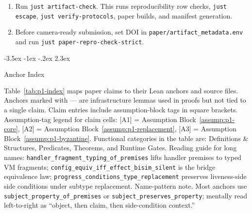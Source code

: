 \documentclass[a4paper,10pt,twocolumn,english]{article}
\makeatletter
\renewcommand{\section}{\@startsection{section}{1}{\z@}%
  {-3.5ex \@plus -1ex \@minus -.2ex}%
  {2.3ex}%
  {\raggedright\normalfont\large\bfseries}}
\numberwithin{equation}{section}
\theoremstyle{paperdef}
\theoremstyle{paperplain}
\theoremstyle{paperdef}
\theoremstyle{paperremark}
\makeatother
\begin{document}
\begin{enumerate}
	\item Run \texttt{just artifact-check}. This runs reproducibility row checks, \texttt{just escape}, \texttt{just verify-protocols}, paper builds, and manifest generation.
	\item Before camera-ready submission, set DOI in \texttt{paper/artifact\_metadata.env} and run \texttt{just paper-repro-check-strict}.
\end{enumerate}

\clearpage
\onecolumn

\section{Anchor Index}
\label{app:index}

Table~\ref{tab:p1-index} maps paper claims to their Lean anchors and source files. Anchors marked with --- are infrastructure lemmas used in proofs but not tied to a single claim. Claim entries include assumption-block tags in square brackets.
Assumption-tag legend for claim cells: [A1] = Assumption
Block~\ref{assump:p1-core}, [A2] = Assumption
Block~\ref{assump:p1-replacement}, [A3] = Assumption
Block~\ref{assump:p1-byzantine}.
Functional categories in the table are: Definitions \& Structures, Predicates,
Theorems, and Runtime Gates. Reading guide for long names:
\texttt{handler\_fragment\_typing\_of\_premises} lifts handler premises to typed
VM fragments; \texttt{config\_equiv\_iff\_effect\_bisim\_silent} is the bridge
equivalence law; \texttt{progress\_conditions\_type\_replacement} preserves
liveness-side side conditions under subtype replacement.
Name-pattern note. Most anchors use
\texttt{subject\_property\_of\_premises} or
\texttt{subject\_preserves\_property}; mentally read left-to-right as
``object, then claim, then side-condition context.''
\end{document}
